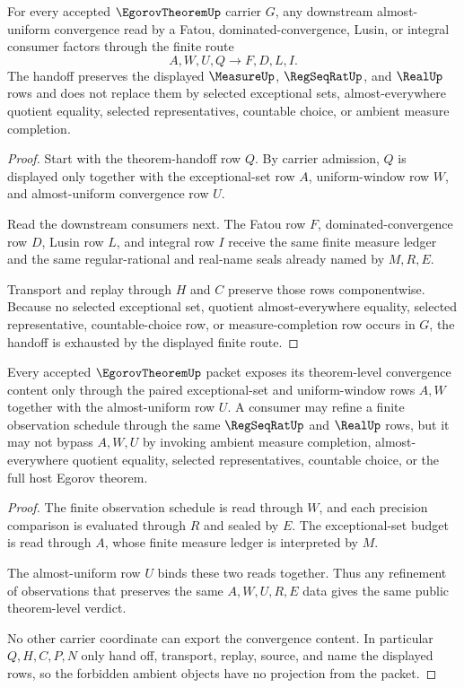 \begin{theorem}
\label{thm:egorov-theorem-finite-handoff}
For every accepted $\EgorovTheoremUp$ carrier $G$, any downstream almost-uniform convergence read by a Fatou, dominated-convergence, Lusin, or integral consumer factors through the finite route
$$
A,W,U,Q \longrightarrow F,D,L,I .
$$
The handoff preserves the displayed $\MeasureUp$, $\RegSeqRatUp$, and $\RealUp$ rows and does not replace them by selected exceptional sets, almost-everywhere quotient equality, selected representatives, countable choice, or ambient measure completion.
\end{theorem}
\begin{proof}
Start with the theorem-handoff row $Q$. By carrier admission, $Q$ is displayed only together with the exceptional-set row $A$, uniform-window row $W$, and almost-uniform convergence row $U$.

Read the downstream consumers next. The Fatou row $F$, dominated-convergence row $D$, Lusin row $L$, and integral row $I$ receive the same finite measure ledger and the same regular-rational and real-name seals already named by $M,R,E$.

Transport and replay through $H$ and $C$ preserve those rows componentwise. Because no selected exceptional set, quotient almost-everywhere equality, selected representative, countable-choice row, or measure-completion row occurs in $G$, the handoff is exhausted by the displayed finite route.
\end{proof}

\begin{theorem}
\label{thm:egorov-theorem-exceptional-window-nonescape}
Every accepted $\EgorovTheoremUp$ packet exposes its theorem-level convergence content only through the paired exceptional-set and uniform-window rows $A,W$ together with the almost-uniform row $U$. A consumer may refine a finite observation schedule through the same $\RegSeqRatUp$ and $\RealUp$ rows, but it may not bypass $A,W,U$ by invoking ambient measure completion, almost-everywhere quotient equality, selected representatives, countable choice, or the full host Egorov theorem.
\end{theorem}
\begin{proof}
The finite observation schedule is read through $W$, and each precision comparison is evaluated through $R$ and sealed by $E$. The exceptional-set budget is read through $A$, whose finite measure ledger is interpreted by $M$.

The almost-uniform row $U$ binds these two reads together. Thus any refinement of observations that preserves the same $A,W,U,R,E$ data gives the same public theorem-level verdict.

No other carrier coordinate can export the convergence content. In particular $Q,H,C,P,N$ only hand off, transport, replay, source, and name the displayed rows, so the forbidden ambient objects have no projection from the packet.
\end{proof}

